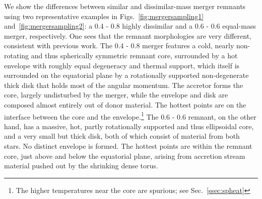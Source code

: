 We show the differences between similar and dissimilar-mass merger remnants using two representative examples in Figs.~\ref{fig:mergersampling1} and~\ref{fig:mergersampling2}: a 0.4 - 0.8 {\Msun} highly dissimilar and a 0.6 - 0.6 {\Msun} equal-mass merger, respectively.  One sees that the remnant morphologies are very different, consistent with previous work.  The 0.4 - 0.8 {\Msun} merger features a cold, nearly non-rotating and thus spherically symmetric remnant core, surrounded by a hot envelope with roughly equal degeneracy and thermal support, which itself is surrounded on the equatorial plane by a rotationally supported non-degenerate thick disk that holds most of the angular momentum.  The accretor forms the core, largely undisturbed by the merger, while the envelope and disk are composed almost entirely out of donor material.  The hottest points are on the interface between the core and the envelope.\footnote{The higher temperatures near the core are spurious; see Sec.~\ref{ssec:spheat}}  The 0.6 - 0.6 {\Msun} remnant, on the other hand, has a massive, hot, partly rotationally supported and thus ellipsoidal core, and a very small but thick disk, both of which consist of material from both stars.  No distinct envelope is formed.  The hottest points are within the remnant core, just above and below the equatorial plane, arising from accretion stream material pushed out by the shrinking dense torus.





